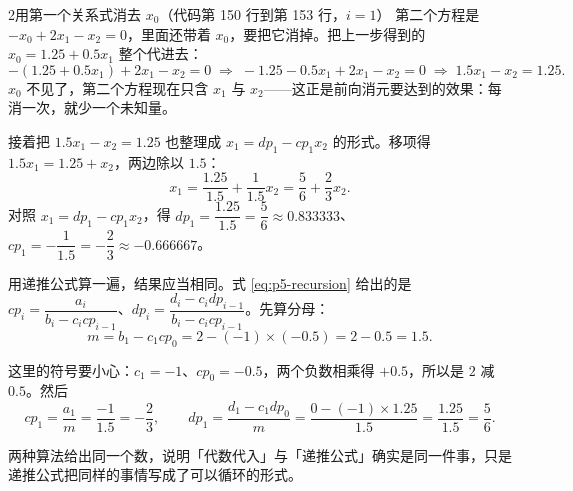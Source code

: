 \begin{stepbox}{2}{用第一个关系式消去 $x_0$（代码第 150 行到第 153 行，$i=1$）}
第二个方程是 $-x_0+2x_1-x_2=0$，里面还带着 $x_0$，要把它消掉。把上一步得到的 $x_0=1.25+0.5x_1$ 整个代进去：
\begin{equation}
-\left(1.25+0.5x_1\right)+2x_1-x_2=0
\;\Longrightarrow\;
-1.25-0.5x_1+2x_1-x_2=0
\;\Longrightarrow\;
1.5x_1-x_2=1.25 .
\label{eq:p5-ex2}
\end{equation}
$x_0$ 不见了，第二个方程现在只含 $x_1$ 与 $x_2$——这正是前向消元要达到的效果：每消一次，就少一个未知量。

接着把 $1.5x_1-x_2=1.25$ 也整理成 $x_1=dp_1-cp_1x_2$ 的形式。移项得 $1.5x_1=1.25+x_2$，两边除以 $1.5$：
\begin{equation}
x_1=\frac{1.25}{1.5}+\frac{1}{1.5}x_2=\frac56+\frac23x_2 .
\label{eq:p5-ex2v}
\end{equation}
对照 $x_1=dp_1-cp_1x_2$，得 $dp_1=\dfrac{1.25}{1.5}=\dfrac56\approx0.833333$、$cp_1=-\dfrac{1}{1.5}=-\dfrac23\approx-0.666667$。

用递推公式算一遍，结果应当相同。式 \eqref{eq:p5-recursion} 给出的是 $cp_i=\dfrac{a_i}{b_i-c_icp_{i-1}}$、$dp_i=\dfrac{d_i-c_idp_{i-1}}{b_i-c_icp_{i-1}}$。先算分母：
\begin{equation}
m=b_1-c_1cp_0=2-(-1)\times(-0.5)=2-0.5=1.5 .
\label{eq:p5-ex2m}
\end{equation}

这里的符号要小心：$c_1=-1$、$cp_0=-0.5$，两个负数相乘得 $+0.5$，所以是 $2$ 减 $0.5$。然后
\begin{equation}
cp_1=\frac{a_1}{m}=\frac{-1}{1.5}=-\frac23,\qquad
dp_1=\frac{d_1-c_1dp_0}{m}=\frac{0-(-1)\times1.25}{1.5}=\frac{1.25}{1.5}=\frac56 .
\end{equation}

两种算法给出同一个数，说明「代数代入」与「递推公式」确实是同一件事，只是递推公式把同样的事情写成了可以循环的形式。
\end{stepbox}

